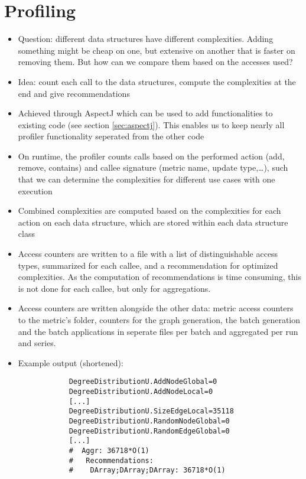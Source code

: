 \section{Profiling}
	\begin{itemize}
		\item Question: different data structures have different complexities. Adding something
			might be cheap on one, but extensive on another that is faster on removing them. But
			how can we compare them based on the accesses used?
		\item Idea: count each call to the data structures, compute the complexities at the
			end and give recommendations
		\item Achieved through AspectJ which can be used to add functionalities to existing code
			(see section \ref{sec:aspectj}). This enables us to keep nearly all profiler
			functionality seperated from the other code
		\item On runtime, the profiler counts calls based on the performed action (add, remove,
			contains) and callee signature (metric name, update type,\ldots), such that we can
			determine the complexities for different use cases with one execution
		\item Combined complexities are computed based on the complexities for each action on
			each data structure, which are stored within each data structure class
		\item Access counters are written to a file with a list of distinguishable access types,
			summarized for each callee, and a recommendation for optimized complexities. As the
			computation of recommendations is time consuming, this is not done for each callee, but
			only for aggregations.
		\item Access counters are written alongside the other data: metric access counters to
			the metric's folder, counters for the graph generation, the batch generation and the
			batch applications in seperate files per batch and aggregated per run and series.
		\item Example output (shortened):
			
		\begin{verbatim}
			DegreeDistributionU.AddNodeGlobal=0
			DegreeDistributionU.AddNodeLocal=0
			[...]
			DegreeDistributionU.SizeEdgeLocal=35118
			DegreeDistributionU.RandomNodeGlobal=0
			DegreeDistributionU.RandomEdgeGlobal=0
			[...]
			#  Aggr: 36718*O(1)
			#   Recommendations:
			#    DArray;DArray;DArray: 36718*O(1)
		\end{verbatim}
	\end{itemize}
